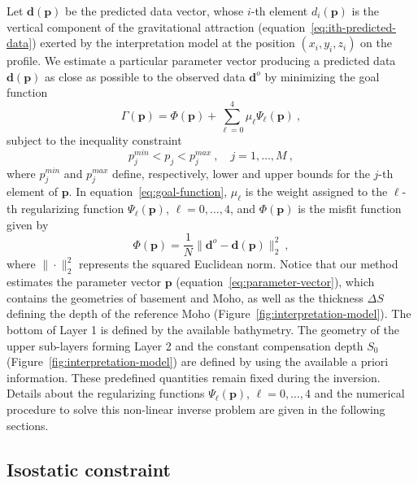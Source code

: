 \documentclass[manuscript]{geophysics}
\begin{document}
Let $\mathbf{d}(\mathbf{p})$ be the predicted data vector, whose $i$-th element
$d_{i}(\mathbf{p})$ is the vertical component of the gravitational attraction
(equation~\ref{eq:ith-predicted-data}) exerted by the interpretation model
at the position $(x_{i}, y_{i}, z_{i})$ on the profile.
We estimate a particular parameter vector producing a predicted data
$\mathbf{d}(\mathbf{p})$ as close as possible to the observed data 
$\mathbf{d}^{o}$ by minimizing the goal function
\begin{equation}
\Gamma (\mathbf{p}) = \Phi(\mathbf{p}) + \sum_{\ell = 0}^{4} \mu_{\ell}
\Psi_{\ell}(\mathbf{p}) \: ,
\label{eq:goal-function}
\end{equation}
subject to the inequality constraint 
\begin{equation}
p_{j}^{min} < p_{j} < p_{j}^{max} \: , \quad j = 1, \dots, M \: ,
\label{eq:inequality-constraint}
\end{equation}
where $p_{j}^{min}$ and $p_{j}^{max}$ define, respectively, lower and upper bounds 
for the $j$-th element of $\mathbf{p}$.
In equation~\ref{eq:goal-function}, $\mu_{\ell}$ is the weight assigned to the 
$\ell$-th regularizing function $\Psi_{\ell}(\mathbf{p})$, $\ell = 0, \dots, 4$, and
$\Phi(\mathbf{p})$ is the misfit function given by
\begin{equation}
\Phi(\mathbf{p}) = \frac{1}{N} \| \mathbf{d}^{o} - \mathbf{d}(\mathbf{p}) \|_{2}^{2} 
\: , 
\label{eq:misfit-function}
\end{equation}
where $\| \cdot \|_{2}^{2}$ represents the squared Euclidean norm. 
Notice that our method estimates the parameter vector $\mathbf{p}$ 
(equation~\ref{eq:parameter-vector}), which contains the geometries of 
basement and Moho, as well as the thickness $\Delta S$ defining
the depth of the reference Moho (Figure~\ref{fig:interpretation-model}).
The bottom of Layer 1 is defined by the available bathymetry. The geometry of the 
upper sub-layers forming Layer 2 and the constant compensation depth $S_{0}$ 
(Figure~\ref{fig:interpretation-model}) are defined by using the available a 
priori information.
These predefined quantities remain fixed during the inversion.
Details about the regularizing functions $\Psi_{\ell}(\mathbf{p})$, $\ell = 0, \dots, 4$ 
and the numerical procedure to solve this non-linear inverse problem are given in the 
following sections.


\subsection{Isostatic constraint}
\end{document}
